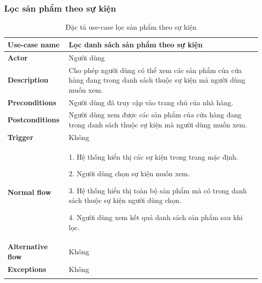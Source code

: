 \subsubsection{Lọc sản phẩm theo sự kiện }
\begin{center}
    {
        \setlength\extrarowheight{6pt}
        \begin{longtable}{| p{} | p{} |}
            \hline
            \textbf{Use-case name}
             &
            Lọc danh sách sản phẩm theo sự kiện
            \\
            \hline
            \textbf{Actor}
             &
            Người dùng
            \\
            \hline
            \textbf{Description}
             &
            Cho phép người dùng có thể xem các sản phẩm của cửa hàng đang trong danh sách thuộc sự kiện mà người dùng muốn xem.
            \\
            \hline
            \textbf{Preconditions}
             &
            Người dùng đã truy cập vào trang chủ của nhà hàng.
            \\
            \hline
            \textbf{Postconditions}
             &
            Người dùng xem được các sản phẩm của cửa hàng đang trong danh sách thuộc sự kiện mà người dùng muốn xem.
            \\
            \hline
            \textbf{Trigger}
             &
            Không
            \\
            \hline
            \textbf{Normal flow}
             &
            1. Hệ thống hiển thị các sự kiện trong trang mặc định.

            2. Người dùng chọn sự kiện muốn xem.

            3. Hệ thống hiển thị toàn bộ sản phẩm mà có trong danh sách thuộc sự kiện người dùng chọn.

            4. Người dùng xem kết quả danh sách sản phẩm sau khi lọc.
            \\
            \hline
            \textbf{Alternative flow}
             &
            Không
            \\
            \hline
            \textbf{Exceptions}
             &
            Không
            \\
            \hline
            \caption{Đặc tả use-case lọc sản phẩm theo sự kiện}
        \end{longtable}
    }
\end{center}


